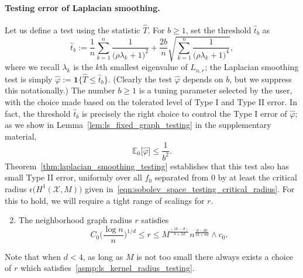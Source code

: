 \documentclass[twoside]{article}
\newcommand{\1}{\mathbf{1}}
\newcommand{\Lap}{L}
\newcommand{\Xset}{\mathcal{X}}
\newcommand{\Ebb}{\mathbb{E}}
\newcommand{\wh}[1]{\widehat{#1}}
\theoremstyle{definition}
\theoremstyle{remark}
\begin{document}
\paragraph{Testing error of Laplacian smoothing.}
Let us define a test using the statistic $\wh{T}$. For $b \geq 1$, set the threshold $\wh{t}_b$ as
\begin{equation*}
\wh{t}_{b} := \frac{1}{n}\sum_{k = 1}^{n} \frac{1}{\bigl(\rho \lambda_k + 1\bigr)^2} + \frac{2b}{n}\sqrt{\sum_{k = 1}^{n} \frac{1}{\bigl(\rho \lambda_k + 1\bigr)^4}},
\end{equation*}
where we recall $\lambda_k$ is the $k$th smallest eigenvalue of $\Lap_{n,r}$; the Laplacian smoothing test is simply $\wh{\varphi} := \1\bigl\{\wh{T} \leq \wh{t}_b\bigr\}$. (Clearly the test $\wh{\varphi}$ depends on $b$, but we suppress this notationally.) The number $b \geq 1$ is a tuning parameter selected by the user, with the choice made based on the tolerated level of Type I and Type II error. In fact, the threshold $\wh{t}_b$ is precisely the right choice to control the Type I error of $\wh{\varphi}$; as we show in Lemma~\ref{lem:ls_fixed_graph_testing} in the supplementary material,
\begin{equation}
\label{eqn:type_I_error}
\Ebb_0\bigl[\wh{\varphi}\bigr] \leq \frac{1}{b^2}.
\end{equation}
Theorem~\ref{thm:laplacian_smoothing_testing} establishes that this test also has small Type II error, uniformly over all $f_0$ separated from $0$ by at least the critical radius $\epsilon\bigl(H^1(\Xset,M)\bigr)$ given in~\eqref{eqn:sobolev_space_testing_critical_radius}. For this to hold, we will require a tight range of scalings for $r$.
\begin{enumerate}[label=(R\arabic*)]
	\setcounter{enumi}{1}
	\item 
	\label{asmp:ls_kernel_radius_testing}
	The neighborhood graph radius $r$ satisfies
	\begin{equation*}
	C_0\biggl(\frac{\log n}{n}\biggr)^{1/d} \leq r \leq M^{\frac{(16 - d)}{8 + 2d}}n^{\frac{d - 20}{32 + 8d}} \wedge c_0.
	\end{equation*}
\end{enumerate}
Note that when $d < 4$, as long as $M$ is not too small there always exists a choice of $r$ which satisfies~\ref{asmp:ls_kernel_radius_testing}.
\end{document}
